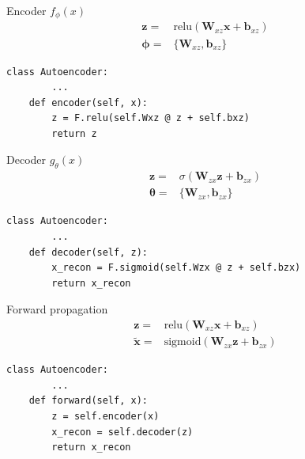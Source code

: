 \documentclass{beamer}
\newcommand{\relu}{\mathrm{relu}}
\newcommand{\sig}{\mathrm{sigmoid}}
\begin{document}
\begin{frame}[fragile]{Encoder $f_\phi(x)$}
\begin{align}
	\mathbf{z} =& \relu\left(\mathbf{W}_{xz}\mathbf{x}+\mathbf{b}_{xz}\right)\\
	\bm{\phi}=&\{\mathbf{W}_{xz}, \mathbf{b}_{xz}\} 
\end{align}
\begin{verbatim}
class Autoencoder:
        ...
    def encoder(self, x):
        z = F.relu(self.Wxz @ z + self.bxz)
        return z
\end{verbatim}
\end{frame}

\begin{frame}[fragile]{Decoder $g_\theta(x)$}
\begin{align}
	\mathbf{z} 
	=& \sigma\left(\mathbf{W}_{zx}\mathbf{z}+\mathbf{b}_{zx}\right)\\
\bm{\theta}=&\{\mathbf{W}_{zx}, \mathbf{b}_{zx}\} 
\end{align}
\begin{verbatim}
class Autoencoder:
        ...
    def decoder(self, z):
        x_recon = F.sigmoid(self.Wzx @ z + self.bzx)
        return x_recon
\end{verbatim}
\end{frame}

\begin{frame}[fragile]{Forward propagation}
\begin{equation}
\begin{split}
\mathbf{z} =& \relu\left(\mathbf{W}_{xz}\mathbf{x}+\mathbf{b}_{xz}\right)\\
\tilde{\mathbf{x}} =& \sig\left(\mathbf{W}_{zx}\mathbf{z}+\mathbf{b}_{zx}\right) 
\end{split}
\end{equation}
\begin{verbatim}
class Autoencoder:
        ...
    def forward(self, x):
        z = self.encoder(x)
        x_recon = self.decoder(z)
        return x_recon
\end{verbatim}
\end{frame}
\end{document}
